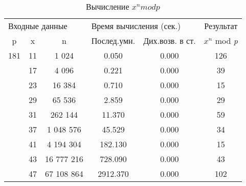 \documentclass{mai_book}
\begin{document}
\newpage
\begin{table}
\centering
\begin{tabular}{|*{6}{c|}}
\hline 
\multicolumn{3}{l}{Входные данные} & \multicolumn{2}{l}{Время вычисления (сек.)} & Результат\\
p & x & n & Послед.умн. & Дих.возв. в ст. & $x^n$ mod {\it p}\\ 
\hline
181 & 11 & 1 024 & 0.050& 0.000& 126\\
 & 17& 4 096& 0.221 & 0.000& 39\\
 & 23 & 16 384 & 0.710 & 0.000& 15\\
 & 29 & 65 536 & 2.859 & 0.000& 29\\
 & 31 & 262 144 & 11.370 & 0.000& 59\\
 & 37 & 1 048 576 & 45.529 & 0.000 & 34\\
 & 41 & 4 194 304 & 182.130 & 0.000 & 15\\
 & 43 & 16 777 216 & 728.090 & 0.000 & 43\\
 & 47 & 67 108 864 & 2912.370 & 0.000 & 102\\
\hline
\end{tabular}
\caption{ Вычисление $x^n mod p$}
\end{table}
\end{document}
